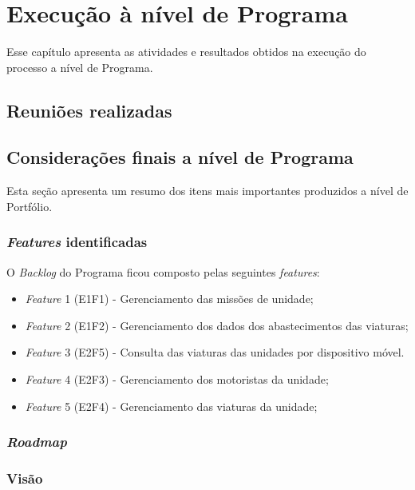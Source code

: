 \chapter{Execução à nível de Programa}

  Esse capítulo apresenta as atividades e resultados obtidos na execução do processo a nível de Programa.
  
  \section{Reuniões realizadas}
  
  
  \section{Considerações finais a nível de Programa}
    
    Esta seção apresenta um resumo dos itens mais importantes produzidos a nível de Portfólio.
    
    \subsection{\textit{Features} identificadas}
      
      O \textit{Backlog} do Programa ficou composto pelas seguintes \textit{features}:
      
      \begin{itemize}
       \item \textit{Feature} 1 (E1F1) - Gerenciamento das missões de unidade;
       \item \textit{Feature} 2 (E1F2) - Gerenciamento dos dados dos abastecimentos das viaturas;
       \item \textit{Feature} 3 (E2F5) - Consulta das viaturas das unidades por dispositivo móvel. 
       \item \textit{Feature} 4 (E2F3) - Gerenciamento dos motoristas da unidade;
       \item \textit{Feature} 5 (E2F4) - Gerenciamento das viaturas da unidade;
      \end{itemize}
      
    \subsection{\textit{Roadmap}}
    
    
    \subsection{Visão}